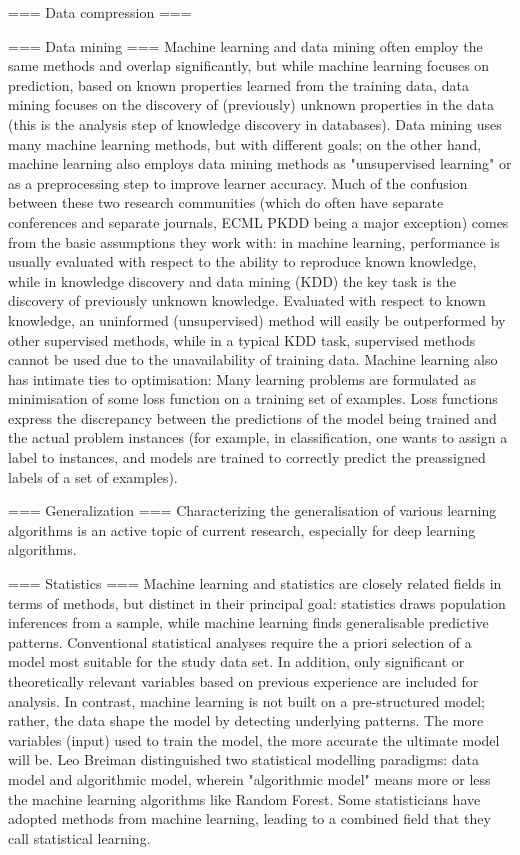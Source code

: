 === Data compression ===


=== Data mining ===
Machine learning and data mining often employ the same methods and overlap significantly, but while machine learning focuses on prediction, based on known properties learned from the training data, data mining focuses on the discovery of (previously) unknown properties in the data (this is the analysis step of knowledge discovery in databases). Data mining uses many machine learning methods, but with different goals; on the other hand, machine learning also employs data mining methods as "unsupervised learning" or as a preprocessing step to improve learner accuracy. Much of the confusion between these two research communities (which do often have separate conferences and separate journals, ECML PKDD being a major exception) comes from the basic assumptions they work with: in machine learning, performance is usually evaluated with respect to the ability to reproduce known knowledge, while in knowledge discovery and data mining (KDD) the key task is the discovery of previously unknown knowledge. Evaluated with respect to known knowledge, an uninformed (unsupervised) method will easily be outperformed by other supervised methods, while in a typical KDD task, supervised methods cannot be used due to the unavailability of training data.
Machine learning also has intimate ties to optimisation: Many learning problems are formulated as minimisation of some loss function on a training set of examples. Loss functions express the discrepancy between the predictions of the model being trained and the actual problem instances (for example, in classification, one wants to assign a label to instances, and models are trained to correctly predict the preassigned labels of a set of examples).


=== Generalization ===
Characterizing the generalisation of various learning algorithms is an active topic of current research, especially for deep learning algorithms.


=== Statistics ===
Machine learning and statistics are closely related fields in terms of methods, but distinct in their principal goal: statistics draws population inferences from a sample, while machine learning finds generalisable predictive patterns.
Conventional statistical analyses require the a priori selection of a model most suitable for the study data set. In addition, only significant or theoretically relevant variables based on previous experience are included for analysis. In contrast, machine learning is not built on a pre-structured model; rather, the data shape the model by detecting underlying patterns. The more variables (input) used to train the model, the more accurate the ultimate model will be.
Leo Breiman distinguished two statistical modelling paradigms: data model and algorithmic model, wherein "algorithmic model" means more or less the machine learning algorithms like Random Forest.
Some statisticians have adopted methods from machine learning, leading to a combined field that they call statistical learning.


